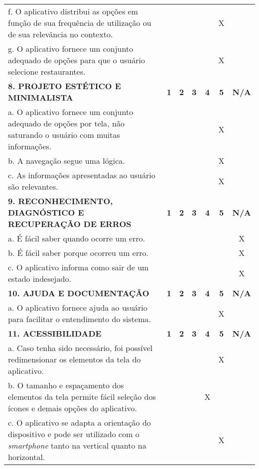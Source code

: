 \documentclass[portuguese,oneside]{tcc}
\begin{document}
\begin{table}[h]
{\begin{tabu}{|L{25em}|c|c|c|c|c|c|}
							f. O aplicativo distribui as opções em função de sua frequência de utilização ou de sua relevância no contexto.	& & & & & X & \\ 
							g. O aplicativo fornece um conjunto adequado de opções para que o usuário selecione restaurantes. & & & & & X & \\ 
							\textbf{8. PROJETO ESTÉTICO E MINIMALISTA} & \textbf{1} & \textbf{2} & \textbf{3} & \textbf{4} & \textbf{5} & \textbf{N/A} \\ 
							a. O aplicativo fornece um conjunto adequado de opções por tela, não saturando o usuário com muitas informações. & & & & & X & \\ 
							b. A navegação segue uma lógica. & & & & & X & \\ 
							c. As informações apresentadas ao usuário são relevantes. & & & & & X & \\ 
							\textbf{9. RECONHECIMENTO, DIAGNÓSTICO E RECUPERAÇÃO DE ERROS} & \textbf{1} & \textbf{2} & \textbf{3} & \textbf{4} & \textbf{5} & \textbf{N/A} \\ 
							a. É fácil saber quando ocorre um erro.	& & & & & & X \\ 
							b. É fácil saber porque ocorreu um erro. & & & & & & X \\ 
							c. O aplicativo informa como sair de um estado indesejado. & & & & & & X \\ 
							\textbf{10. AJUDA E DOCUMENTAÇÃO} & \textbf{1} & \textbf{2} & \textbf{3} & \textbf{4} & \textbf{5} & \textbf{N/A} \\ 
							a. O aplicativo fornece ajuda ao usuário para facilitar o entendimento do sistema. & & & & & X & \\ 
							\textbf{11. ACESSIBILIDADE} & \textbf{1} & \textbf{2} & \textbf{3} & \textbf{4} & \textbf{5} & \textbf{N/A} \\ 
							a. Caso tenha sido necessário, foi possível redimensionar os elementos da tela do aplicativo. & & & & & X & \\ 
							b. O tamanho e espaçamento dos elementos da tela permite fácil seleção dos ícones e demais opções do aplicativo. & & & & X & & \\ 
							c. O aplicativo se adapta a orientação do dispositivo e pode ser utilizado com o \emph{smartphone} tanto na vertical quanto na horizontal. & & & & & X & \\ 

\end{tabu}}
\end{table}
\end{document}
